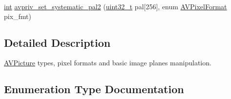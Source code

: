\begin{DoxyCompactItemize}
\item 
\hyperlink{xmltok_8h_a5a0d4a5641ce434f1d23533f2b2e6653}{int} \hyperlink{group__lavu__picture_ga70c8ff744ad06fe3b6f0aaf5ec8fa14a}{avpriv\+\_\+set\+\_\+systematic\+\_\+pal2} (\hyperlink{lib-src_2ffmpeg_2win32_2stdint_8h_a6eb1e68cc391dd753bc8ce896dbb8315}{uint32\+\_\+t} pal\mbox{[}256\mbox{]}, enum \hyperlink{pixfmt_8h_a9a8e335cf3be472042bc9f0cf80cd4c5}{A\+V\+Pixel\+Format} pix\+\_\+fmt)
\end{DoxyCompactItemize}


\subsection{Detailed Description}
\hyperlink{struct_a_v_picture}{A\+V\+Picture} types, pixel formats and basic image planes manipulation. 

\subsection{Enumeration Type Documentation}
